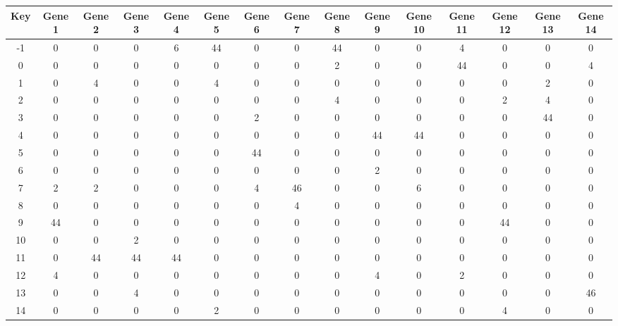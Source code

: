 \begin{tabular}{|c|c|c|c|c|c|c|c|c|c|c|c|c|c|c|}
\hline
Key & Gene 1 & Gene 2 & Gene 3 & Gene 4 & Gene 5 & Gene 6 & Gene 7 & Gene 8 & Gene 9 & Gene 10 & Gene 11 & Gene 12 & Gene 13 & Gene 14 \\
\hline
-1 & 0 & 0 & 0 & 6 & 44 & 0 & 0 & 44 & 0 & 0 & 4 & 0 & 0 & 0 \\
0 & 0 & 0 & 0 & 0 & 0 & 0 & 0 & 2 & 0 & 0 & 44 & 0 & 0 & 4 \\
1 & 0 & 4 & 0 & 0 & 4 & 0 & 0 & 0 & 0 & 0 & 0 & 0 & 2 & 0 \\
2 & 0 & 0 & 0 & 0 & 0 & 0 & 0 & 4 & 0 & 0 & 0 & 2 & 4 & 0 \\
3 & 0 & 0 & 0 & 0 & 0 & 2 & 0 & 0 & 0 & 0 & 0 & 0 & 44 & 0 \\
4 & 0 & 0 & 0 & 0 & 0 & 0 & 0 & 0 & 44 & 44 & 0 & 0 & 0 & 0 \\
5 & 0 & 0 & 0 & 0 & 0 & 44 & 0 & 0 & 0 & 0 & 0 & 0 & 0 & 0 \\
6 & 0 & 0 & 0 & 0 & 0 & 0 & 0 & 0 & 2 & 0 & 0 & 0 & 0 & 0 \\
7 & 2 & 2 & 0 & 0 & 0 & 4 & 46 & 0 & 0 & 6 & 0 & 0 & 0 & 0 \\
8 & 0 & 0 & 0 & 0 & 0 & 0 & 4 & 0 & 0 & 0 & 0 & 0 & 0 & 0 \\
9 & 44 & 0 & 0 & 0 & 0 & 0 & 0 & 0 & 0 & 0 & 0 & 44 & 0 & 0 \\
10 & 0 & 0 & 2 & 0 & 0 & 0 & 0 & 0 & 0 & 0 & 0 & 0 & 0 & 0 \\
11 & 0 & 44 & 44 & 44 & 0 & 0 & 0 & 0 & 0 & 0 & 0 & 0 & 0 & 0 \\
12 & 4 & 0 & 0 & 0 & 0 & 0 & 0 & 0 & 4 & 0 & 2 & 0 & 0 & 0 \\
13 & 0 & 0 & 4 & 0 & 0 & 0 & 0 & 0 & 0 & 0 & 0 & 0 & 0 & 46 \\
14 & 0 & 0 & 0 & 0 & 2 & 0 & 0 & 0 & 0 & 0 & 0 & 4 & 0 & 0 \\
\hline
\end{tabular}